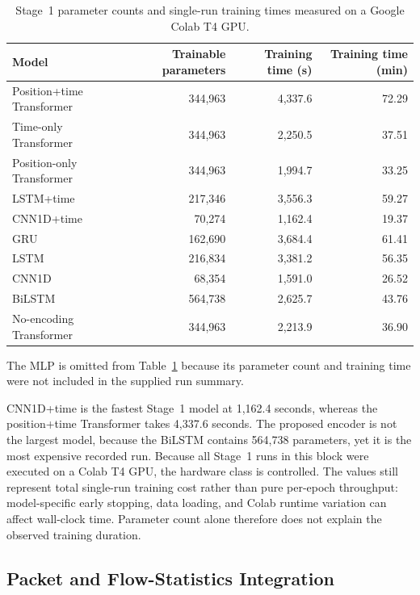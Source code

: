 \documentclass[11pt,fleqn]{report}
\begin{document}
\begin{table}[H]
    \centering
    \caption{Stage~1 parameter counts and single-run training times measured on
    a Google Colab T4 GPU.}
    \label{tab:results_stage1_errors_efficiency}
    \begin{tabular}{@{}lrrr@{}}
        \toprule
        Model & Trainable parameters & Training time (s) & Training time (min) \\
        \midrule
        Position+time Transformer & 344,963 & 4,337.6 & 72.29 \\
        Time-only Transformer & 344,963 & 2,250.5 & 37.51 \\
        Position-only Transformer & 344,963 & 1,994.7 & 33.25 \\
        LSTM+time & 217,346 & 3,556.3 & 59.27 \\
        CNN1D+time & 70,274 & 1,162.4 & 19.37 \\
        GRU & 162,690 & 3,684.4 & 61.41 \\
        LSTM & 216,834 & 3,381.2 & 56.35 \\
        CNN1D & 68,354 & 1,591.0 & 26.52 \\
        BiLSTM & 564,738 & 2,625.7 & 43.76 \\
        No-encoding Transformer & 344,963 & 2,213.9 & 36.90 \\
        \bottomrule
    \end{tabular}
\end{table}

The MLP is omitted from Table~\ref{tab:results_stage1_errors_efficiency}
because its parameter count and training time were not included in the
supplied run summary.

CNN1D+time is the fastest Stage~1 model at 1,162.4 seconds, whereas the
position+time Transformer takes 4,337.6 seconds. The proposed encoder is not
the largest model, because the BiLSTM contains 564,738 parameters, yet it is
the most expensive recorded run. Because all Stage~1 runs in this block were
executed on a Colab T4 GPU, the hardware class is controlled. The values still
represent total single-run training cost rather than pure per-epoch throughput:
model-specific early stopping, data loading, and Colab runtime variation can
affect wall-clock time. Parameter count alone therefore does not explain the
observed training duration.

\subsection{Packet and Flow-Statistics Integration}
\label{subsubsec:results_stage1_fusion}
\end{document}
